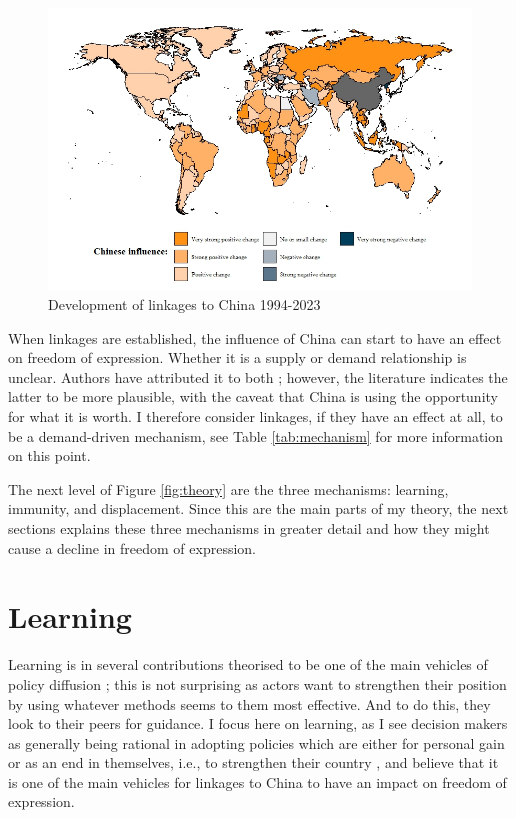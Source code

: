 \begin{figure}
    \centering
    \includegraphics[width=\linewidth]{graphics/chinese_influence.jpeg}
    \caption{Development of linkages to China 1994-2023}
    \label{fig:link-china}
\end{figure}

When linkages are established, the influence of China can start to have an effect on freedom of expression. Whether it is a supply or demand relationship is unclear. Authors have attributed it to both \citep[e.g., see:][]{ambrosio_rise_2012, bader_china_2015, brand_authoritarian_2015, economy_exporting_2020, gamso_is_2021, loughlin_chinese_2021, risse_democracy_2015, toettoe_foreign_2023, weyland_autocratic_2017}; however, the literature indicates the latter to be more plausible, with the caveat that China is using the opportunity for what it is worth. I therefore consider linkages, if they have an effect at all, to be a demand-driven mechanism, see Table \ref{tab:mechanism} for more information on this point. 

The next level of Figure \ref{fig:theory} are the three mechanisms: learning, immunity, and displacement. Since this are the main parts of my theory, the next sections explains these three mechanisms in greater detail and how they might cause a decline in freedom of expression.

\section{Learning}
Learning is in several contributions theorised to be one of the main vehicles of policy diffusion \citep{gilardi_four_2016, shipan_mechanisms_2008, simmons_introduction_2006}; this is not surprising as actors want to strengthen their position by using whatever methods seems to them most effective. And to do this, they look to their peers for guidance. I focus here on learning, as I see decision makers as generally being rational in adopting policies which are either for personal gain or as an end in themselves, i.e., to strengthen their country \citep{shipan_mechanisms_2008}, and believe that it is one of the main vehicles for linkages to China to have an impact on freedom of expression.

